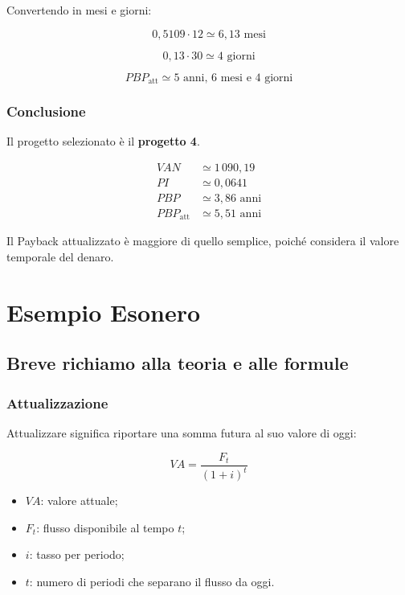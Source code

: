 \noindent Convertendo in mesi e giorni:

\[
0{,}5109\cdot12\simeq6{,}13\text{ mesi}
\]

\[
0{,}13\cdot30\simeq4\text{ giorni}
\]

\[
\boxed{
PBP_{\text{att}}\simeq
5\text{ anni, }6\text{ mesi e }4\text{ giorni}
}
\]

\subsubsection*{Conclusione}

\noindent Il progetto selezionato è il \textbf{progetto 4}.

\[
\boxed{
\begin{aligned}
VAN &\simeq1\,090{,}19\\
PI &\simeq0{,}0641\\
PBP &\simeq3{,}86\text{ anni}\\
PBP_{\text{att}} &\simeq5{,}51\text{ anni}
\end{aligned}
}
\]

\noindent Il Payback attualizzato è maggiore di quello semplice,
poiché considera il valore temporale del denaro.
\newpage
\section{Esempio Esonero}

\subsection{Breve richiamo alla teoria e alle formule}

\subsubsection*{Attualizzazione}

\noindent Attualizzare significa riportare
una somma futura al suo valore di oggi:

\[
\boxed{
VA=\frac{F_t}{(1+i)^t}
}
\]

\begin{itemize}
    \item $VA$: valore attuale;
    \item $F_t$: flusso disponibile al tempo $t$;
    \item $i$: tasso per periodo;
    \item $t$: numero di periodi
    che separano il flusso da oggi.
\end{itemize}

